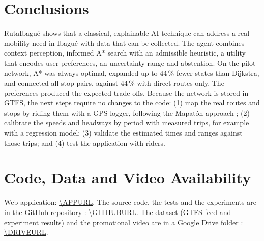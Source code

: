\documentclass[10pt,twocolumn,letterpaper]{article}
\begin{document}
\section{Conclusions}\label{sec:conclusions}
RutaIbagué shows that a classical, explainable AI technique can address a real mobility need in Ibagué with data that can be collected. The agent combines context perception, informed A* search with an admissible heuristic, a utility that encodes user preferences, an uncertainty range and abstention. On the pilot network, A* was always optimal, expanded up to 44\,\% fewer states than Dijkstra, and connected all stop pairs, against 44\,\% with direct routes only. The preferences produced the expected trade-offs. Because the network is stored in GTFS, the next steps require no changes to the code: (1) map the real routes and stops by riding them with a GPS logger, following the Mapatón approach \cite{mapaton,osmguide}; (2) calibrate the speeds and headways by period with measured trips, for example with a regression model; (3) validate the estimated times and ranges against those trips; and (4) test the application with riders.

\section{Code, Data and Video Availability}\label{sec:avail}
\noindent Web application: \url{\APPURL}. The source code, the tests and the experiments are in the GitHub repository \cite{repo}: \url{\GITHUBURL}. The dataset (GTFS feed and experiment results) and the promotional video are in a Google Drive folder \cite{drive}: \url{\DRIVEURL}.
\end{document}
